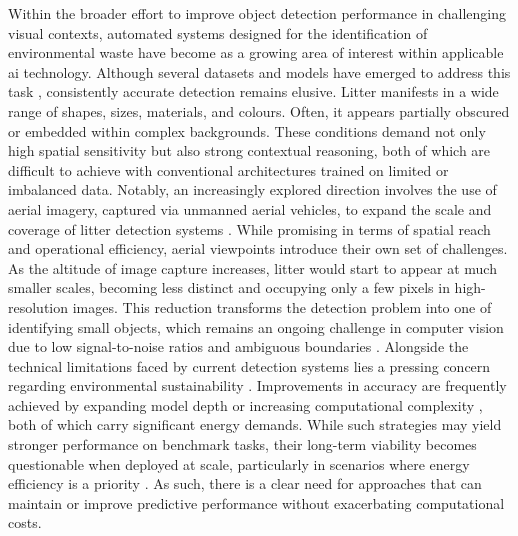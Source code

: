 Within the broader effort to improve object detection performance in challenging visual contexts, automated systems designed for the identification of environmental waste have become as a growing area of interest within applicable \gls{ai} technology. Although several datasets and models have emerged to address this task \cite{taco2020, zerowaste, plastopol}, consistently accurate detection remains elusive. Litter manifests in a wide range of shapes, sizes, materials, and colours. Often, it appears partially obscured or embedded within complex backgrounds. These conditions demand not only high spatial sensitivity but also strong contextual reasoning, both of which are difficult to achieve with conventional architectures trained on limited or imbalanced data.
Notably, an increasingly explored direction involves the use of aerial imagery, captured via unmanned aerial vehicles, to expand the scale and coverage of litter detection systems \cite{uavvaste, soda_dataset, detect_litter}. While promising in terms of spatial reach and operational efficiency, aerial viewpoints introduce their own set of challenges. As the altitude of image capture increases, litter would start to appear at much smaller scales, becoming less distinct and occupying only a few pixels in high-resolution images. This reduction transforms the detection problem into one of identifying small objects, which remains an ongoing challenge in computer vision due to low signal-to-noise ratios and ambiguous boundaries \cite{small_detection_survey, small_detection}.
Alongside the technical limitations faced by current detection systems lies a pressing concern regarding environmental sustainability \cite{sdgs}. Improvements in accuracy are frequently achieved by expanding model depth or increasing computational complexity \cite{detr, rt-detr}, both of which carry significant energy demands. While such strategies may yield stronger performance on benchmark tasks, their long-term viability becomes questionable when deployed at scale, particularly in scenarios where energy efficiency is a priority \cite{pilz2024increasedcomputeefficiencydiffusion}. As such, there is a clear need for approaches that can maintain or improve predictive performance without exacerbating computational costs. 


